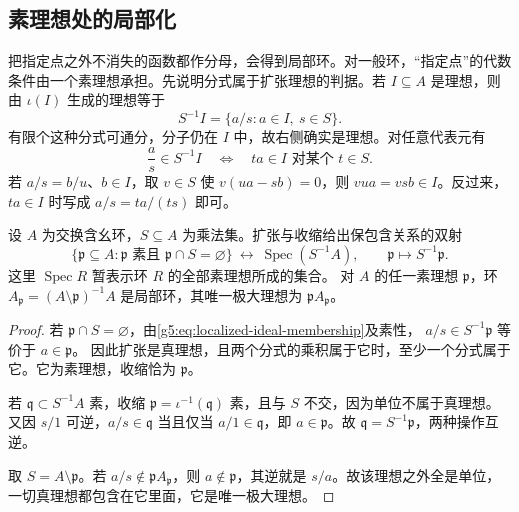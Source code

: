 \subsection{素理想处的局部化}
\label{g5:subsec:0201:02}

把指定点之外不消失的函数都作分母，会得到局部环。对一般环，“指定点”的代数条件由一个素理想承担。先说明分式属于扩张理想的判据。若 \(I\subseteq A\) 是理想，则由 \(\iota(I)\) 生成的理想等于
\[
	S^{-1}I=\{a/s:a\in I,\ s\in S\}.
\]
有限个这种分式可通分，分子仍在 \(I\) 中，故右侧确实是理想。对任意代表元有
\begin{equation}\label{g5:eq:localized-ideal-membership}
	\frac as\in S^{-1}I
	\quad\Longleftrightarrow\quad
	ta\in I\text{ 对某个 }t\in S.
\end{equation}
若 \(a/s=b/u\)、\(b\in I\)，取 \(v\in S\) 使 \(v(ua-sb)=0\)，则 \(vua=vsb\in I\)。反过来，\(ta\in I\) 时写成 \(a/s=ta/(ts)\) 即可。

\begin{theorem}\label{g5:thm:prime-localization}
	设 \(A\) 为交换含幺环，\(S\subseteq A\) 为乘法集。扩张与收缩给出保包含关系的双射
	\[
	\{\mathfrak p\subseteq A:\mathfrak p\text{ 素且 }\mathfrak p\cap S=\varnothing\}
	\ \longleftrightarrow\ \operatorname{Spec}(S^{-1}A),
	\qquad \mathfrak p\longmapsto S^{-1}\mathfrak p.
	\]
	这里 \(\operatorname{Spec}R\) 暂表示环 \(R\) 的全部素理想所成的集合。 对 \(A\) 的任一素理想 \(\mathfrak p\)，环 \(A_{\mathfrak p}=(A\setminus\mathfrak p)^{-1}A\) 是局部环，其唯一极大理想为 \(\mathfrak pA_{\mathfrak p}\)。
\end{theorem}
\begin{proof}
	若 \(\mathfrak p\cap S=\varnothing\)，由\eqref{g5:eq:localized-ideal-membership}及素性， \(a/s\in S^{-1}\mathfrak p\) 等价于 \(a\in\mathfrak p\)。 因此扩张是真理想，且两个分式的乘积属于它时，至少一个分式属于它。它为素理想，收缩恰为 \(\mathfrak p\)。

	若 \(\mathfrak q\subset S^{-1}A\) 素，收缩 \(\mathfrak p=\iota^{-1}(\mathfrak q)\) 素，且与 \(S\) 不交，因为单位不属于真理想。 又因 \(s/1\) 可逆，\(a/s\in\mathfrak q\) 当且仅当 \(a/1\in\mathfrak q\)，即 \(a\in\mathfrak p\)。故 \(\mathfrak q=S^{-1}\mathfrak p\)，两种操作互逆。

	取 \(S=A\setminus\mathfrak p\)。若 \(a/s\notin\mathfrak pA_{\mathfrak p}\)，则 \(a\notin\mathfrak p\)，其逆就是 \(s/a\)。故该理想之外全是单位，一切真理想都包含在它里面，它是唯一极大理想。
\end{proof}

